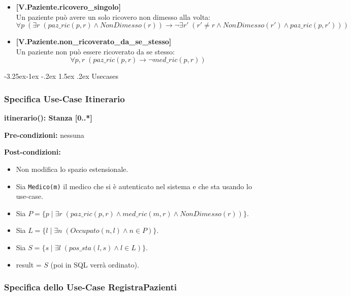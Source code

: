 \documentclass{article}
\makeatletter
\renewcommand\subsection{\@startsection{subsection}{2}{\z@}%
                                     {-3.25ex\@plus-1ex \@minus-.2ex}%
                                     {1.5ex \@plus.2ex}%
                                     {\normalfont\normalsize\bfseries}}
\makeatother
\begin{document}
\begin{itemize}
    \item \textbf{[V.Paziente.ricovero\_singolo]}\\
    Un paziente può avere un solo ricovero non dimesso alla volta:
    \[
    \forall p \; (\exists r \; (paz\_ric(p,r) \land NonDimesso(r)) \rightarrow \neg \exists r' \; (r' \neq r \land NonDimesso(r') \land paz\_ric(p,r')))
    \]
    
    \item \textbf{[V.Paziente.non\_ricoverato\_da\_se\_stesso]}\\
    Un paziente non può essere ricoverato da se stesso:
    \[
    \forall p,r \; (paz\_ric(p,r) \rightarrow \neg med\_ric(p,r))
    \]
\end{itemize}


\newpage

\subsection{Usecases}

\subsubsection{Specifica Use-Case Itinerario}

\textbf{itinerario(): Stanza [0..*]}

\textbf{Pre-condizioni:} nessuna

\textbf{Post-condizioni:}
\begin{itemize}
    \item Non modifica lo spazio estensionale.
    \item Sia \texttt{Medico(m)} il medico che si è autenticato nel sistema e che sta usando lo use-case.
    \item Sia \( P = \{p \mid \exists r \; (paz\_ric(p,r) \land med\_ric(m,r) \land NonDimesso(r))\} \).
    \item Sia \( L = \{l \mid \exists n \; (Occupato(n,l) \land n \in P)\} \).
    \item Sia \( S = \{s \mid \exists l \; (pos\_sta(l,s) \land l \in L)\} \).
    \item result = \( S \) (poi in SQL verrà ordinato).
\end{itemize}

\newpage
\subsubsection{Specifica dello Use-Case RegistraPazienti}
\end{document}
